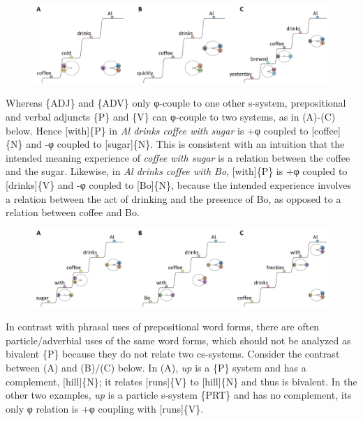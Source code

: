   
\begin{figure}
\includegraphics[width=\textwidth]{figures/Tilsen-img83.png}
\caption{\missingcaption}
\label{fig:4:33}
\end{figure}
 

  Whereas \{ADJ\} and \{ADV\} only φ-couple to one other s-system, prepositional and verbal adjuncts \{P\} and \{V\} can φ-couple to two systems, as in (A)-(C) below. Hence [with]\{P\} in \textit{Al drinks coffee with sugar} is +φ coupled to [coffee]\{N\} and -φ coupled to [sugar]\{N\}. This is consistent with an intuition that the intended meaning experience of \textit{coffee with sugar} is a relation between the coffee and the sugar. Likewise, in \textit{Al drinks coffee with Bo}, [with]\{P\} is +φ coupled to [drinks]\{V\} and -φ coupled to [Bo]\{N\}, because the intended experience involves a relation between the act of drinking and the presence of Bo, as opposed to a relation between coffee and Bo.

  
\begin{figure}
\includegraphics[width=\textwidth]{figures/Tilsen-img84.png}
\caption{\missingcaption}
\label{fig:4:34}
\end{figure}
 

  In contrast with phrasal uses of prepositional word forms, there are often particle/adverbial uses of the same word forms, which should not be analyzed as bivalent \{P\} because they do not relate two cs-systems. Consider the contrast between (A) and (B)/(C) below. In (A), \textit{up} is a \{P\} system and has a complement, [hill]\{N\}; it relates [runs]\{V\} to [hill]\{N\} and thus is bivalent. In the other two examples, \textit{up} is a particle s-system \{PRT\} and has no complement, its only φ relation is +φ coupling with [runs]\{V\}.

